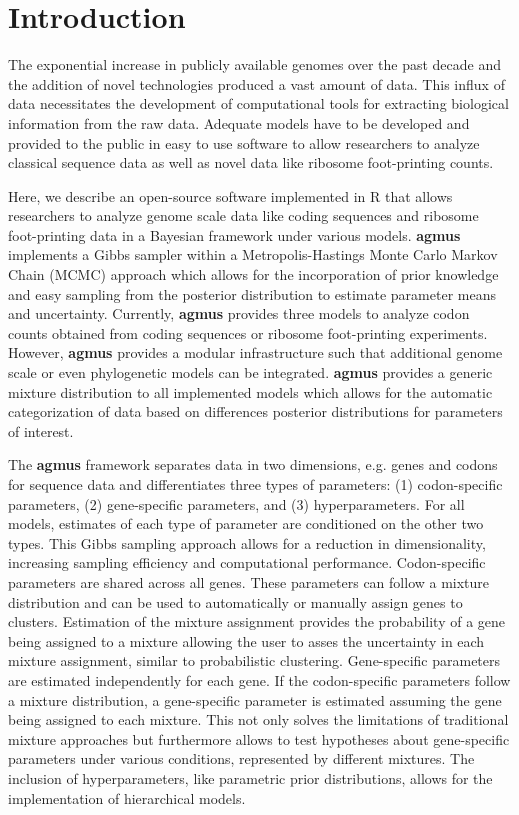 \documentclass{bioinfo}
\newcommand{\package}{\textbf{agmus }} %
\begin{document}
\section*{Introduction}
The exponential increase in publicly available genomes over the past decade and the addition of novel technologies produced a vast amount of data.  
This influx of data necessitates the development of computational tools for extracting biological information from the raw data. 
Adequate models have to be developed and provided to the public in easy to use software to allow researchers to analyze classical sequence data as well as novel data like ribosome foot-printing counts.

Here, we describe an open-source software implemented in R \citep{rcore} that allows researchers to analyze genome scale data like coding sequences and ribosome foot-printing data in a Bayesian framework under various models. 
\package implements a Gibbs sampler within a Metropolis-Hastings Monte Carlo Markov Chain (MCMC) approach which allows for the incorporation of prior knowledge and easy sampling from the posterior distribution to estimate parameter means and uncertainty.
Currently, \package provides three models to analyze codon counts obtained from coding sequences or ribosome foot-printing experiments. However, \package provides a modular infrastructure such that additional genome scale or even phylogenetic models can be integrated. 
\package provides a generic mixture distribution to all implemented models which allows for the automatic categorization of data based on differences posterior distributions for parameters of interest.

The \package framework separates data in two dimensions, e.g. genes and codons for sequence data and differentiates three types of parameters: (1) codon-specific parameters, (2) gene-specific parameters, and (3) hyperparameters. 
For all models, estimates of each type of parameter are conditioned on the other two types. 
This Gibbs sampling approach allows for a reduction in dimensionality, increasing sampling efficiency and computational performance.
Codon-specific parameters are shared across all genes. These parameters can follow a mixture distribution and can be used to automatically or manually assign genes to clusters.
Estimation of the mixture assignment provides the probability of a gene being assigned to a mixture allowing the user to asses the uncertainty in each mixture assignment, similar to probabilistic clustering.
Gene-specific parameters are estimated independently for each gene. If the codon-specific parameters follow a mixture distribution, a gene-specific parameter is estimated assuming the gene being assigned to each mixture. This not only solves the limitations of traditional mixture approaches but furthermore allows to test hypotheses about gene-specific parameters under various conditions, represented by different mixtures.
The inclusion of hyperparameters, like parametric prior distributions, allows for the implementation of hierarchical models.
\end{document}
